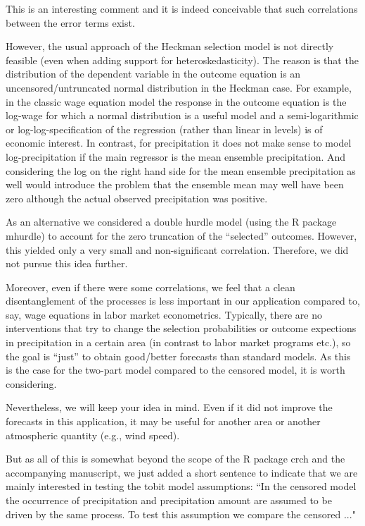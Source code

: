 \documentclass[12pt,a4paper]{article}
\begin{document}
This is an interesting comment and it is indeed conceivable that such correlations
between the error terms exist.

However, the usual approach of the Heckman selection
model is not directly feasible (even when adding support for heteroskedasticity).
The reason is that the distribution of the dependent variable in the outcome
equation is an uncensored/untruncated normal distribution in the Heckman case. For example,
in the classic wage equation model the response in the outcome equation is the
log-wage for which a normal distribution is a useful model and a semi-logarithmic
or log-log-specification of the regression (rather than linear in levels) is
of economic interest. In contrast, for precipitation it does not make sense
to model log-precipitation if the main regressor is the mean ensemble precipitation.
And considering the log on the right hand side for the mean ensemble precipitation
as well would introduce the problem that the ensemble mean may well have been zero
although the actual observed precipitation was positive.

As an alternative we considered a double hurdle model (using the R package
mhurdle) to account for the zero truncation of the ``selected'' outcomes.
However, this yielded only a very small and non-significant correlation.
Therefore, we did not pursue this idea further.

Moreover, even if there were some correlations, we feel that a clean disentanglement
of the processes is less important in our application compared to, say, wage
equations in labor market econometrics. Typically, there are no interventions
that try to change the selection probabilities or outcome expections in
precipitation in a certain area (in contrast to labor market programs etc.),
so the goal is ``just'' to obtain good/better forecasts than standard models.
As this is the case for the two-part model compared to the censored model,
it is worth considering.

Nevertheless, we will keep your idea in mind. Even if it did not improve the
forecasts in this application, it may be useful for another area or another
atmospheric quantity (e.g., wind speed).

But as all of this is somewhat beyond the scope of the R package crch and the
accompanying manuscript, we just added a short sentence to indicate that
we are mainly interested in testing the tobit model assumptions:
``In the censored model the occurrence of precipitation and precipitation amount
are assumed to be driven by the same process. To test this assumption we compare
the censored ..." 
\end{document}
